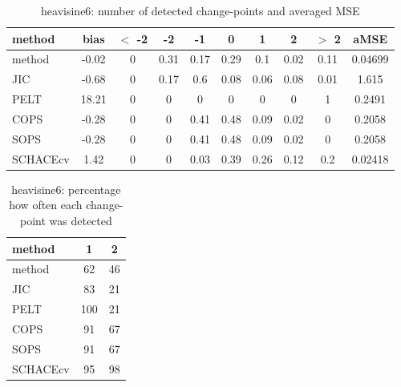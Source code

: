 \begin{table}[ht]
\centering
\begin{tabular}{l|c|ccccccc|c}
  \hline
method & bias & $<$ -2 & -2 & -1 & 0 & 1 & 2 & $>$ 2 & aMSE \\ 
  \hline
method & -0.02 &     0 &  0.31 &  0.17 &  0.29 &   0.1 &  0.02 &  0.11 & 0.04699 \\ 
  JIC & -0.68 &     0 &  0.17 &   0.6 &  0.08 &  0.06 &  0.08 &  0.01 & 1.615 \\ 
  PELT & 18.21 &     0 &     0 &     0 &     0 &     0 &     0 &     1 & 0.2491 \\ 
  COPS & -0.28 &     0 &     0 &  0.41 &  0.48 &  0.09 &  0.02 &     0 & 0.2058 \\ 
  SOPS & -0.28 &     0 &     0 &  0.41 &  0.48 &  0.09 &  0.02 &     0 & 0.2058 \\ 
  SCHACEcv &  1.42 &     0 &     0 &  0.03 &  0.39 &  0.26 &  0.12 &   0.2 & 0.02418 \\ 
   \hline
\end{tabular}
\caption{heavisine6: number of detected change-points and averaged MSE} 
\label{tab:heavisine6Njumps}
\end{table}
\begin{table}[ht]
\centering
\begin{tabular}{l|cc}
  \hline
method & 1 & 2 \\ 
  \hline
method &     62 &     46 \\ 
  JIC &     83 &     21 \\ 
  PELT &    100 &     21 \\ 
  COPS &     91 &     67 \\ 
  SOPS &     91 &     67 \\ 
  SCHACEcv &     95 &     98 \\ 
   \hline
\end{tabular}
\caption{heavisine6: percentage how often each change-point was detected} 
\label{tab:heavisine6Detections}
\end{table}
